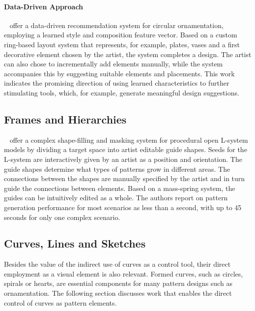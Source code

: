 
\paragraph{Data-Driven Approach}
\label{para:analysis_element_arrangements_datadriven}

\citeauthor*{phan_2016_ple}~\cite{phan_2016_ple} offer a data-driven recommendation system for circular ornamentation, employing a learned style and composition feature vector. Based on a custom ring-based layout system that represents, for example, plates, vases and a first decorative element chosen by the artist, the system completes a design. The artist can also chose to incrementally add elements manually, while the system accompanies this by suggesting suitable elements and placements. This work indicates the promising direction of using learned characteristics to further stimulating tools, which, for example, generate meaningful design suggestions.


\subsection{Frames and Hierarchies}
\label{subsec:analysis_frames_and_hierarchies}

\citeauthor*{benes_2011_gpm}~\cite{benes_2011_gpm} offer a complex shape-filling and masking system for procedural open L-system models by dividing a target space into artist editable guide shapes. Seeds for the L-system are interactively given by an artist as a position and orientation. The guide shapes determine what types of patterns grow in different areas. The connections between the shapes are manually specified by the artist and in turn guide the connections between elements. Based on a mass-spring system, the guides can be intuitively edited as a whole. The authors report on pattern generation performance for most scenarios as less than a second, with up to 45 seconds for only one complex scenario.



\subsection{Curves, Lines and Sketches}
\label{subsec:analysis_curves_lines_and_sketches}

Besides the value of the indirect use of curves as a control tool, their direct employment as a visual element is also relevant. Formed curves, such as circles, spirals or hearts, are essential components for many pattern designs such as ornamentation. The following section discusses work that enables the direct control of curves as pattern elements.

